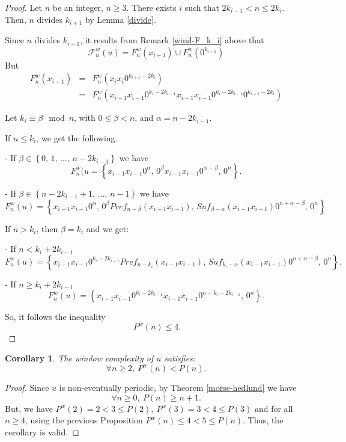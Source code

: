 \documentclass[a4 paper,12pt]{article}
\newtheorem{corollary}{Corollary}[section]
\begin{document}
\begin{proof} Let $n$ be an integer, $n\geq 3$. There exists $i$ such that $2k_{i-1}< n\leq 2k_i$. Then, $n$ divides $k_{i+1}$ by Lemma \ref{divide}.


Since $n$ divides $k_{i+1}$, it results from Remark \ref{wind-F_k_i} above that 
$$\mathcal{F}^{w}_{n}(u)=F^{w}_{n}(x_{i+1})\cup F^{w}_{n}(0^{k_{i+1}})$$
But
\begin{eqnarray}
F^{w}_{n}(x_{i+1})&=&F^{w}_{n}(x_{i}x_{i}0^{k_{i+1}-2k_{i}}) \\ 
                  &=&F^{w}_{n}(x_{i-1}x_{i-1}0^{k_{i}-2k_{i-1}}x_{i-1}x_{i-1}0^{k_{i}-2k_{i-1}}0^{k_{i+1}-2k_{i}})
\end{eqnarray}

Let $k_i\equiv \beta \mod n$, with $0\leq \beta< n$, and $\alpha=n-2k_{i-1}$.

If $n\leq k_{i}$, we get the following.

- If $\beta \in \left\{0,\, 1,\, \ldots,\,n-2k_{i-1}\right\}$ we have  
$$ F^{w}_{n}(u=\left\{x_{i-1}x_{i-1}0^{\alpha},\, 0^{\beta} x_{i-1}x_{i-1}0^{\alpha-\beta},\,  0^n\right\}.$$

- If $\beta \in \left\{n-2k_{i-1}+1,\, \ldots,\,n-1\right\}$ we have  
$$ F^{w}_{n}(u)=\left\{x_{i-1}x_{i-1}0^{\alpha},\,  0^{\beta}Pref_{n-\beta}(x_{i-1}x_{i-1}),\, Suf_{\beta-\alpha}(x_{i-1}x_{i-1})0^{n+\alpha-\beta},\, 0^n\right\}$$


If $n> k_{i}$, then $\beta=k_i$ and we get:


- If $n<k_i+2k_{i-1}$  
$$ F^{w}_{n}(u)=\left\{x_{i-1}x_{i-1}0^{k_{i}-2k_{i-1}}Pref_{n-k_{i}}(x_{i-1}x_{i-1}),\, Suf_{k_i-\alpha}(x_{i-1}x_{i-1})0^{n+\alpha-\beta},\,  0^n\right\}.$$

- If $n\geq k_i+2k_{i-1}$  
$$ F^{w}_{n}(u)=\left\{x_{i-1}x_{i-1}0^{k_{i}-2k_{i-1}}x_{i-1}x_{i-1}0^{n-k_{i}-2k_{i-1}},\,  0^n\right\}.$$


So, it follows the inequality
$$
\ P^{w}(n)\leq 4.$$  
\end{proof}

\begin{corollary} The window complexity of $u$ satisfies:
$$\forall n\geq 2, \ P^w(n)<P(n).$$
\end{corollary}

\begin{proof} Since $u$ is non-eventually periodic, by Theorem \ref{morse-hedlund} we have 
$$\forall n\geq 0, \ P(n)\geq n+1. $$
 But, we have $ P^w(2)=2<3\leq P(2), \  P^w(3)=3<4\leq P(3)$ and for all $n\geq 4$, using the previous Proposition $ P^w(n)\leq 4<5\leq P(n)$. Thus, the corollary is valid.

 \end{proof}
\end{document}
